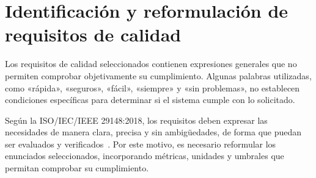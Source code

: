 \section{Identificación y reformulación de requisitos de calidad}

Los requisitos de calidad seleccionados contienen expresiones generales que no permiten comprobar objetivamente su cumplimiento. Algunas palabras utilizadas, como «rápida», «seguros», «fácil», «siempre» y «sin problemas», no establecen condiciones específicas para determinar si el sistema cumple con lo solicitado.

Según la ISO/IEC/IEEE 29148:2018, los requisitos deben expresar las necesidades de manera clara, precisa y sin ambigüedades, de forma que puedan ser evaluados y verificados~\cite{iso29148}. Por este motivo, es necesario reformular los enunciados seleccionados, incorporando métricas, unidades y umbrales que permitan comprobar su cumplimiento.

